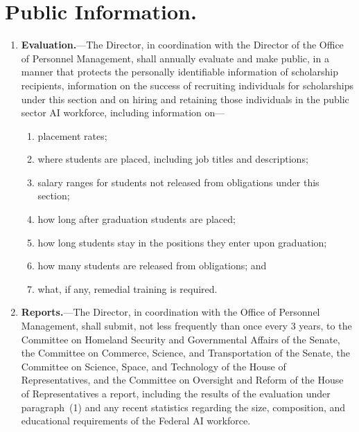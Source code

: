 \documentclass{article}
\begin{document}
    \section{Public Information.}
\begin{enumerate}
            \item {\bf Evaluation.}---The Director, in coordination with the 
        Director of the Office of Personnel Management, shall annually 
        evaluate and make public, in a manner that protects the 
        personally identifiable information of scholarship recipients, 
        information on the success of recruiting individuals for 
        scholarships under this section and on hiring and retaining 
        those individuals in the public sector AI workforce, including 
        information on---
\begin{enumerate}
                    \item placement rates;
                    \item where students are placed, including job titles 
                and descriptions;
                    \item salary ranges for students not released from 
                obligations under this section;
                    \item how long after graduation students are placed;
                    \item how long students stay in the positions they 
                enter upon graduation;
                    \item how many students are released from 
                obligations; and
                    \item what, if any, remedial training is required.
\end{enumerate}
            \item {\bf Reports.}---The Director, in coordination with the Office 
        of Personnel Management, shall submit, not less frequently than 
        once every 3 years, to the Committee on Homeland Security and 
        Governmental Affairs of the Senate, the Committee on Commerce, 
        Science, and Transportation of the Senate, the Committee on 
        Science, Space, and Technology of the House of Representatives, 
        and the Committee on Oversight and Reform of the House of 
        Representatives a report, including the results of the 
        evaluation under paragraph~(1) and any recent statistics 
        regarding the size, composition, and educational requirements 
        of the Federal AI workforce.

\end{enumerate}
\end{document}

